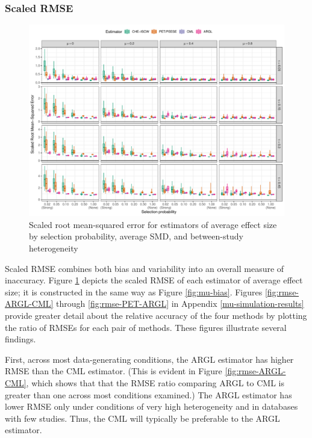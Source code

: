 \documentclass[
  american,
  man, donotrepeattitle,floatsintext]{apa7}
\begin{document}
\subsubsection{Scaled RMSE}\label{scaled-rmse}

\begin{figure}
\includegraphics{step-function-selection-models-with-dependent-effects_files/figure-latex/mu-rmse-1} \caption{Scaled root mean-squared error for estimators of average effect size by selection probability, average SMD, and between-study heterogeneity}\label{fig:mu-rmse}
\end{figure}

Scaled RMSE combines both bias and variability into an overall measure of inaccuracy.
Figure \ref{fig:mu-rmse} depicts the scaled RMSE of each estimator of average effect size; it is constructed in the same way as Figure \ref{fig:mu-bias}.
Figures \ref{fig:rmse-ARGL-CML} through \ref{fig:rmse-PET-ARGL} in Appendix \ref{mu-simulation-results} provide greater detail about the relative accuracy of the four methods by plotting the ratio of RMSEs for each pair of methods.
These figures illustrate several findings.

First, across most data-generating conditions, the ARGL estimator has higher RMSE than the CML estimator. (This is evident in Figure \ref{fig:rmse-ARGL-CML}, which shows that that the RMSE ratio comparing ARGL to CML is greater than one across most conditions examined.)
The ARGL estimator has lower RMSE only under conditions of very high heterogeneity and in databases with few studies.
Thus, the CML will typically be preferable to the ARGL estimator.
\end{document}
